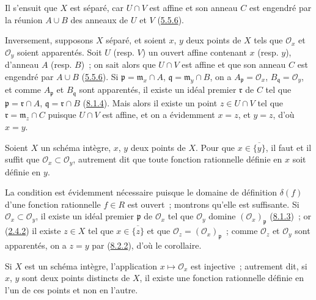 Il s'ensuit que $X$ est séparé, car $U\cap V$ est affine et son anneau $C$ est
engendré par la réunion $A\cup B$ des anneaux de $U$ et $V$
(\hyperref[I.5.5.6-fr]{5.5.6}).

Inversement, supposons $X$ séparé, et soient $x$, $y$ deux points de $X$ tels
que $\mathscr{O}_x$ et $\mathscr{O}_y$ soient apparentés. Soit $U$ (resp.
$V$) un ouvert affine contenant $x$ (resp. $y$), d'anneau $A$ (resp. $B$)~;
on sait alors que $U\cap V$ est affine et que son anneau $C$ est engendré par
$A\cup B$ (\hyperref[I.5.5.6-fr]{5.5.6}). Si
$\mathfrak p=\mathfrak m_x\cap A$, $\mathfrak q=\mathfrak m_y\cap B$, on a
$A_\mathfrak p=\mathscr{O}_x$, $B_\mathfrak q=\mathscr{O}_y$, et comme
$A_\mathfrak p$ et $B_\mathfrak q$ sont apparentés, il existe un idéal premier
$\mathfrak r$ de $C$ tel que $\mathfrak p=\mathfrak r\cap A$,
$\mathfrak q=\mathfrak r\cap B$ (\hyperref[I.8.1.4-fr]{8.1.4}). Mais alors il
existe un point $z\in U\cap V$ tel que
$\mathfrak r=\mathfrak m_z\cap C$ puisque $U\cap V$ est affine, et on a
évidemment $x=z$, et $y=z$, d'où $x=y$.

\begin{corollary}[8.2.3]
\label{I.8.2.3-fr}
Soient $X$ un schéma intègre, $x$, $y$ deux points de $X$. Pour que
$x\in\overline{\{y\}}$, il faut et il suffit que
$\mathscr{O}_x\subset\mathscr{O}_y$, autrement dit que toute fonction
rationnelle définie en $x$ soit définie en $y$.
\end{corollary}

La condition est évidemment nécessaire puisque le domaine de définition
$\delta(f)$ d'une fonction rationnelle $f\in R$ est ouvert~; montrons qu'elle
est suffisante. Si $\mathscr{O}_x\subset\mathscr{O}_y$, il existe un idéal
premier $\mathfrak p$ de $\mathscr{O}_x$ tel que $\mathscr{O}_y$ domine
$(\mathscr{O}_x)_\mathfrak p$ (\hyperref[I.8.1.3-fr]{8.1.3})~; or
(\hyperref[I.2.4.2-fr]{2.4.2}) il existe $z\in X$ tel que
$x\in\overline{\{z\}}$ et que
$\mathscr{O}_z=(\mathscr{O}_x)_\mathfrak p$~; comme $\mathscr{O}_z$ et
$\mathscr{O}_y$ sont apparentés, on a $z=y$ par
(\hyperref[I.8.2.2-fr]{8.2.2}), d'où le corollaire.

\begin{corollary}[8.2.4]
\label{I.8.2.4-fr}
Si $X$ est un schéma intègre, l'application $x\mapsto\mathscr{O}_x$ est
injective~; autrement dit, si $x$, $y$ sont deux points distincts de $X$, il
existe une fonction rationnelle définie en l'un de ces points et non en
l'autre.
\end{corollary}

